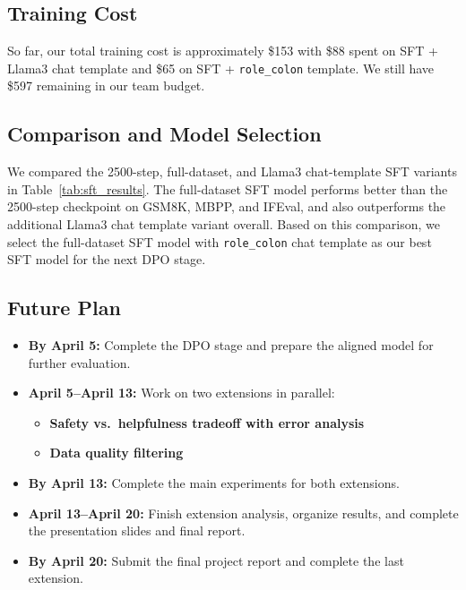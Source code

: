 \documentclass[11pt]{article}
\begin{document}
\subsection{Training Cost}
So far, our total training cost is approximately \$153 with \$88 spent on SFT + Llama3 chat template and \$65 on SFT + \texttt{role\_colon} template. We still have \$597 remaining in our team budget.

\subsection{Comparison and Model Selection}
We compared the 2500-step, full-dataset, and Llama3 chat-template SFT variants in Table~\ref{tab:sft_results}. The full-dataset SFT model performs better than the 2500-step checkpoint on GSM8K, MBPP, and IFEval, and also outperforms the additional Llama3 chat template variant overall. Based on this comparison, we select the full-dataset SFT model with \texttt{role\_colon} chat template as our best SFT model for the next DPO stage. 


\subsection{Future Plan}

\begin{itemize}
    \item \textbf{By April 5:} Complete the DPO stage and prepare the aligned model for further evaluation.
    
    \item \textbf{April 5--April 13:} Work on two extensions in parallel:
    \begin{itemize}
        \item \textbf{Safety vs.~helpfulness tradeoff with error analysis} 
        \item \textbf{Data quality filtering} 
    \end{itemize}
    
    \item \textbf{By April 13:} Complete the main experiments for both extensions.
    
    \item \textbf{April 13--April 20:} Finish extension analysis, organize results, and complete the presentation slides and final report.
    
    \item \textbf{By April 20:} Submit the final project report and complete the last extension.
\end{itemize}
\end{document}

